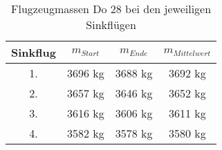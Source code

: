 \begin{table}[h]
	\centering
	\begin{tabular}{|c|c|c|c|}
		\hline
		\textbf{Sinkflug} & \textbf{$m_{Start}$} & \textbf{$m_{Ende}$} & \textbf{$m_{Mittelwert}$} \\ \hline
		1.	& 3696 kg	& 3688 kg & 3692 kg    \\ \hline
		2.	& 3657 kg   & 3646 kg & 3652 kg    \\ \hline
		3.	& 3616 kg	& 3606 kg & 3611 kg	   \\ \hline
		4.  & 3582 kg	& 3578 kg & 3580 kg    \\ \hline
	
		
		
	\end{tabular}
	\caption{Flugzeugmassen Do 28 bei den jeweiligen Sinkflügen}
\end{table}


\newpage